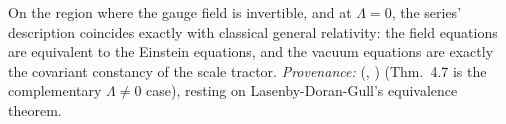 On the region where the gauge field is invertible, and at $\Lambda = 0$, the series' description coincides exactly with classical general relativity: the field equations are equivalent to the Einstein equations, and the vacuum equations are exactly the covariant constancy of the scale tractor. \emph{Provenance:} \cite[Fact 2.1, Thms.~4.5 and 4.7]{ButlerT6} (, ) (Thm.~4.7 is the complementary $\Lambda \neq 0$ case), resting on Lasenby-Doran-Gull's equivalence theorem.
